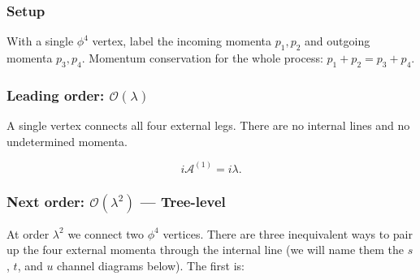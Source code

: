 \documentclass[../main.tex]{subfiles}
\begin{document}
\subsubsection*{Setup}

With a single $\phi^4$ vertex, label the incoming momenta $p_1, p_2$ and outgoing momenta $p_3, p_4$.  Momentum conservation for the whole process: $p_1 + p_2 = p_3 + p_4$.

\subsubsection*{Leading order: $\mathcal{O}(\lambda)$}

A single vertex connects all four external legs.  There are no internal lines and no undetermined momenta.

\begin{center}
\end{center}

\begin{equation}
  i\mathcal{A}^{(1)} = i\lambda.
  \label{eq:lec05:phi4-leading}
\end{equation}

\subsubsection*{Next order: $\mathcal{O}(\lambda^2)$ — Tree-level}

At order $\lambda^2$ we connect two $\phi^4$ vertices.  There are three inequivalent ways to pair up the four external momenta through the internal line (we will name them the $s$, $t$, and $u$ channel diagrams below).  The first is:

\begin{center}
\end{center}
\end{document}
